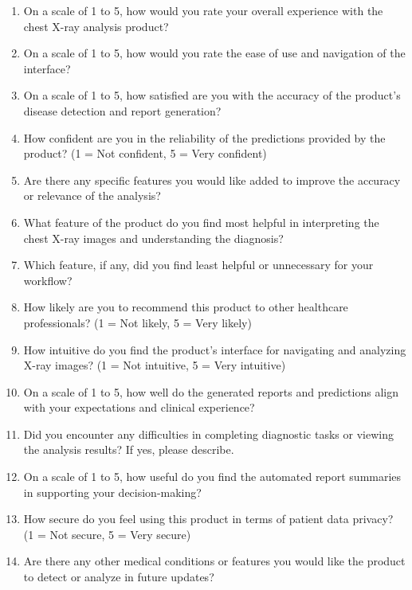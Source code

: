\documentclass[12pt, titlepage]{article}
\begin{document}
\begin{enumerate}
  \item On a scale of 1 to 5, how would you rate your overall experience with the chest X-ray analysis product?
  \item On a scale of 1 to 5, how would you rate the ease of use and navigation of the interface?
  \item On a scale of 1 to 5, how satisfied are you with the accuracy of the product's disease detection and report generation?
  \item How confident are you in the reliability of the predictions provided by the product? (1 = Not confident, 5 = Very confident)
  \item Are there any specific features you would like added to improve the accuracy or relevance of the analysis?
  \item What feature of the product do you find most helpful in interpreting the chest X-ray images and understanding the diagnosis?
  \item Which feature, if any, did you find least helpful or unnecessary for your workflow?
  \item How likely are you to recommend this product to other healthcare professionals? (1 = Not likely, 5 = Very likely)
  \item How intuitive do you find the product's interface for navigating and analyzing X-ray images? (1 = Not intuitive, 5 = Very intuitive)
  \item On a scale of 1 to 5, how well do the generated reports and predictions align with your expectations and clinical experience?
  \item Did you encounter any difficulties in completing diagnostic tasks or viewing the analysis results? If yes, please describe.
  \item On a scale of 1 to 5, how useful do you find the automated report summaries in supporting your decision-making?
  \item How secure do you feel using this product in terms of patient data privacy? (1 = Not secure, 5 = Very secure)
  \item Are there any other medical conditions or features you would like the product to detect or analyze in future updates?
\end{enumerate}




\newpage{}
\end{document}
